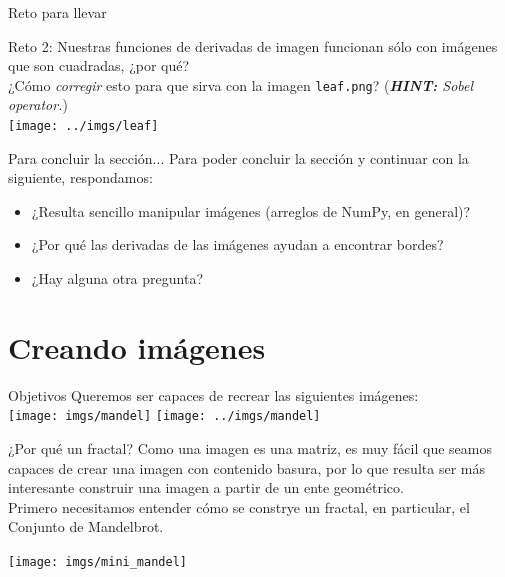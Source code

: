 \documentclass[usenames,dvipsnames]{beamer}
\begin{document}
  \begin{frame}{Reto para llevar}
    \vspace*{0.5cm}
    \begin{block}{Reto 2:}
      Nuestras funciones de derivadas de imagen funcionan sólo con imágenes
      que son cuadradas, ¿por qué?\\
      \vspace*{0.5cm}
      ¿Cómo {\color{orange} \textit{corregir}} esto para que sirva con la imagen
      \texttt{leaf.png}? (\textit{\textbf{HINT:} Sobel operator.})\\
      \centering
      \texttt{[image: ../imgs/leaf]}
      \vspace*{0.5cm}
    \end{block}
  \end{frame}

  \begin{frame}{Para concluir la sección...}
    Para poder concluir la sección y continuar con la siguiente,
    respondamos:
    \begin{itemize}
      \item ¿Resulta sencillo manipular imágenes (arreglos de NumPy,
      en general)?
      \item ¿Por qué las derivadas de las imágenes ayudan a
      encontrar bordes?
      \item ¿Hay alguna otra pregunta?
    \end{itemize}
  \end{frame}

  \section{Creando imágenes}
  \begin{frame}{Objetivos}
    Queremos ser capaces de recrear las siguientes imágenes:\\
    \vspace*{0.3cm}
    \centering
    \hspace*{-0.35cm}
    \texttt{[image: imgs/mandel]}
    \texttt{[image: ../imgs/mandel]}
  \end{frame}

  \begin{frame}{¿Por qué un fractal?}
    Como una imagen es una matriz, es muy fácil que seamos capaces de crear
    una imagen con contenido basura, por lo que resulta ser más interesante
    construir una imagen a partir de un ente geométrico.\\
    \vspace*{0.3cm}
    Primero necesitamos entender cómo se constrye un fractal, en particular,
    el Conjunto de Mandelbrot.
    \begin{center}
      \texttt{[image: imgs/mini\_mandel]}
    \end{center}
  \end{frame}
\end{document}
